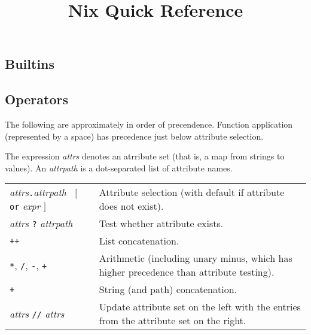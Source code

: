 \documentclass[9pt, a4paper, landscape]{extarticle}
\title{Nix Quick Reference}
\date{\vskip-10ex November 2023}
\newcommand{\cmd}[1]{\texttt{#1}}
\begin{document}
\begin{multicols*}{3}\raggedcolumns%
\maketitle

\section*{Builtins}


\subsection*{Operators}

The following are approximately in order of precendence. Function
application (represented by a space) has precedence just below
attribute selection.

The expression \emph{attrs} denotes an atrribute set (that is, a map
from strings to values). An \emph{attrpath} is a dot-separated list of
attribute names.

\begin{tabularx}{\columnwidth}{@{}l>{\raggedright\arraybackslash}X@{}}

  \parbox[t]{8em}{\emph{attrs}\texttt{.}\emph{attrpath} \\
    ${}\;\;[$ \texttt{or} \emph{expr} $]$}
  & Attribute selection (with default if attribute does not exist). \\

  \emph{attrs} \texttt{?} \emph{attrpath} & Test whether attribute
  exists. \\

  \cmd{++} & List concatenation. \\
  
  \cmd{*}, \cmd{/}, \cmd{-}, \cmd{+} & Arithmetic (including unary
  minus, which has higher precedence than attribute testing). \\
  
  \cmd{+} & String (and path) concatenation. \\

  \emph{attrs} \cmd{//} \emph{attrs} & Update attribute set on the
  left with the entries from the attribute set on the right. \\
  

\end{tabularx}
\end{multicols*}
\end{document}
